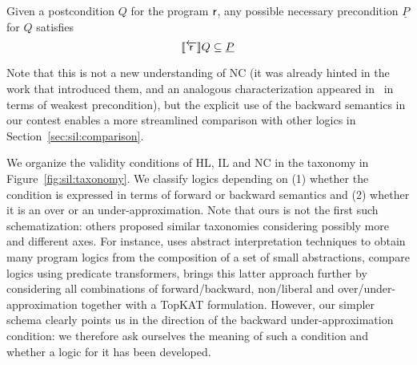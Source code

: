 \begin{prop}\label{prop:sil:nc}
	Given a postcondition $Q$ for the program $\mathsf{r}$, any possible necessary precondition $\underline{P}$ for $Q$ satisfies
	\[
	\llbracket\overleftarrow{\mathsf{r}}\rrbracket Q \subseteq \underline{P}
	\]
\end{prop}

Note that this is not a new understanding of NC (it was already hinted in the work that introduced them, and an analogous characterization appeared in~\cite[§6.3]{ZK22} in terms of weakest precondition), but the explicit use of the backward semantics in our contest enables a more streamlined comparison with other logics in Section~\ref{sec:sil:comparison}.

We organize the validity conditions of HL, IL and NC in the taxonomy in Figure~\ref{fig:sil:taxonomy}. We classify logics depending on (1) whether the condition is expressed in terms of forward or backward semantics and (2) whether it is an over or an under-approximation.
Note that ours is not the first such schematization: others proposed similar taxonomies considering possibly more and different axes. For instance, \cite{Cousot24} uses abstract interpretation techniques to obtain many program logics from the composition of a set of small abstractions, \cite{ZK22} compare logics using predicate transformers, \cite{VK23} brings this latter approach further by considering all combinations of forward/backward, non/liberal and over/under-approximation together with a TopKAT formulation.
However, our simpler schema clearly points us in the direction of the backward under-approximation condition: we therefore ask ourselves the meaning of such a condition and whether a logic for it has been developed.

